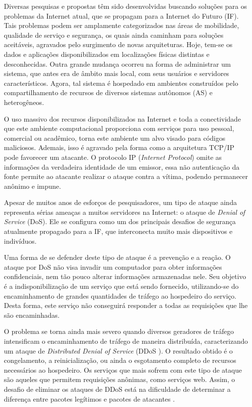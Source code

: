 
Diversas pesquisas e propostas têm sido desenvolvidas buscando soluções para os problemas da Internet atual, que se propagam para a Internet do Futuro (IF). Tais problemas podem ser amplamente categorizados nas áreas de mobilidade, qualidade de serviço e segurança, os quais ainda caminham para soluções aceitáveis, agravados pelo surgimento de novas arquiteturas. Hoje, tem-se os dados e aplicações disponibilizados em localizações físicas distintas e desconhecidas. Outra grande mudança ocorreu na forma de administrar um sistema, que antes era de âmbito mais local, com seus usuários e servidores característicos. Agora, tal sistema é hospedado em ambientes construídos pelo compartilhamento de recursos de diversos sistemas autônomos (AS) e heterogêneos. \cite{5486552}

O uso massivo dos recursos disponibilizados na Internet e toda a conectividade que este ambiente computacional proporciona com serviços para uso pessoal, comercial ou acadêmico, torna este ambiente um alvo visado para códigos maliciosos. Ademais, isso é agravado pela forma como a arquitetura TCP/IP pode favorecer um atacante. O protocolo IP (\emph{Internet Protocol}) omite as informações da verdadeira identidade de um emissor, essa não autenticação da fonte permite ao atacante realizar o ataque contra a vítima, podendo permanecer anônimo e impune. \cite{1039856}

Apesar de muitos anos de esforços de pesquisadores, um tipo de ataque ainda representa sérias ameaças a muitos servidores na Internet: o ataque de  \emph{Denial of Service} (DoS). Ele se configura como um dos principais desafios de segurança atualmente propagado para a IF, que interconecta muito mais dispositivos e indivíduos. 


Uma forma de se defender deste tipo de ataque é a prevenção e a reação. O ataque por DoS não visa invadir um computador para obter informações confidenciais, nem tão pouco alterar informações armazenadas nele. Seu objetivo é a indisponibilização de um serviço que está sendo fornecido, utilizando-se do encaminhamento de grandes quantidades de tráfego ao hospedeiro do serviço. Desta forma, este serviço não conseguirá responder a todas as requisições que lhe são encaminhadas. 

O problema se torna ainda mais severo quando diversos geradores de tráfego intensificam o encaminhamento de tráfego de maneira distribuída, caracterizando um ataque de \emph{Distributed Denial of Service} (DDoS \cite{Sachdeva08ddosincidents}). O resultado obtido é o congelamento, a reinicialização, ou ainda o esgotamento completo de recursos necessários ao hospedeiro. Os serviços que mais sofrem com este tipo de ataque são aqueles que permitem requisições anônimas, como serviços web. Assim, o desafio de eliminar os ataques de DDoS está na dificuldade de determinar a diferença entre pacotes legítimos e pacotes de atacantes \cite{Li:2009:DDA:1683304.1684620}.


